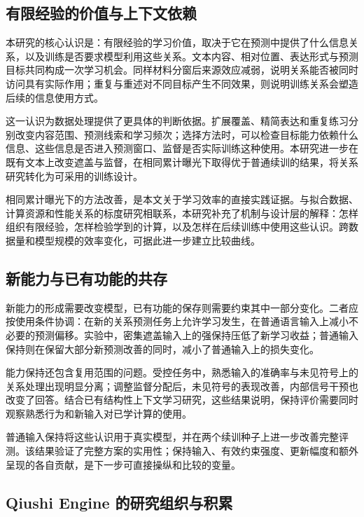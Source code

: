 \label{sec:discussion}

\subsection{有限经验的价值与上下文依赖}

本研究的核心认识是：有限经验的学习价值，取决于它在预测中提供了什么信息关系，以及训练是否要求模型利用这些关系。文本内容、相对位置、表达形式与预测目标共同构成一次学习机会。同样材料分窗后来源效应减弱，说明关系能否被同时访问具有实际作用；重复与重述对不同目标产生不同效果，则说明训练关系会塑造后续的信息使用方式。

这一认识为数据处理提供了更具体的判断依据。扩展覆盖、精简表达和重复练习分别改变内容范围、预测线索和学习频次；选择方法时，可以检查目标能力依赖什么信息、这些信息是否进入预测窗口、监督是否实际训练这种使用。本研究进一步在既有文本上改变遮盖与监督，在相同累计曝光下取得优于普通续训的结果，将关系研究转化为可采用的训练设计。

相同累计曝光下的方法改善，是本文关于学习效率的直接实践证据。与拟合数据、计算资源和性能关系的标度研究\citep{muennighoff2025scaling}相联系，本研究补充了机制与设计层的解释：怎样组织有限经验，怎样检验学到的计算，以及怎样在后续训练中使用这些认识。跨数据量和模型规模的效率变化，可据此进一步建立比较曲线。

\subsection{新能力与已有功能的共存}

新能力的形成需要改变模型，已有功能的保存则需要约束其中一部分变化。二者应按使用条件协调：在新的关系预测任务上允许学习发生，在普通语言输入上减小不必要的预测偏移。实验中，密集遮盖输入上的强保持压低了新学习收益；普通输入保持则在保留大部分新预测改善的同时，减小了普通输入上的损失变化。

能力保持还包含复用范围的问题。受控任务中，熟悉输入的准确率与未见符号上的关系处理出现明显分离；调整监督分配后，未见符号的表现改善，内部信号干预也改变了回答。结合已有结构性上下文学习研究\citep{anand2025dual}，这些结果说明，保持评价需要同时观察熟悉行为和新输入对已学计算的使用。

普通输入保持将这些认识用于真实模型，并在两个续训种子上进一步改善完整评测。该结果验证了完整方案的实用性；保持输入、有效约束强度、更新幅度和额外呈现的各自贡献，是下一步可直接操纵和比较的变量。

\subsection{Qiushi Engine 的研究组织与积累}
\label{sec:research_organization}

